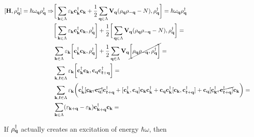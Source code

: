 \documentclass{homework}
\begin{document}
\begin{equation} 
\begin{split}
    [{\bf H}, \rho_{\bf q}^\dagger] = \hbar \omega_{{\bf q}} \rho_{{\bf q}}^\dagger  \Rightarrow & \bigg[\sum_{{\bf k} \in \Lambda} \varepsilon_{{\bf k}} {\bf c}_{{\bf k}}^\dagger {\bf c}_{{\bf k}} + \frac{1}{2} \sum_{{\bf q} \in \Lambda} {\bf V}_{{\bf q}} (\rho_{{\bf q}} \rho_{-{\bf q}} - N), \rho_{\bf q}^\dagger \bigg] = \hbar \omega_{{\bf q}} \rho_{{\bf q}}^\dagger \\
    & \bigg[\sum_{{\bf k} \in \Lambda} \varepsilon_{{\bf k}} {\bf c}_{{\bf k}}^\dagger {\bf c}_{{\bf k}}, \rho_{\bf q}^\dagger\bigg] + \frac{1}{2} \bigg[\sum_{{\bf q} \in \Lambda} {\bf V}_{{\bf q}} (\rho_{{\bf q}} \rho_{-{\bf q}} - N), \rho_{\bf q}^\dagger \bigg] = \\
    & \sum_{{\bf k} \in \Lambda} \varepsilon_{{\bf k}} \bigg[ {\bf c}_{{\bf k}}^\dagger {\bf c}_{{\bf k}}, \rho_{\bf q}^\dagger\bigg] + \frac{1}{2} \sum_{{\bf q} \in \Lambda} {\bf V}_{{\bf q}} \cancel{\bigg[\rho_{{\bf q}} \rho_{-{\bf q}}, \rho_{\bf q}^\dagger\bigg]} = \\
    & \sum_{{\bf k}, \mathfrak{k} \in \Lambda} \varepsilon_{{\bf k}} \bigg[ {\bf c}_{{\bf k}}^\dagger {\bf c}_{{\bf k}}, {\bf c}_{{\bf q}} {\bf c}_{{\bf \mathfrak{k} + q}}^\dagger \bigg] =  \\
    &\sum_{{\bf k}, \mathfrak{k} \in \Lambda} \varepsilon_{{\bf k}} \bigg({\bf c}_{{\bf k}}^\dagger \cancel{[{\bf c}_{{\bf k}}, {\bf c}_{{\bf q}}]} {\bf c}_{{\bf \mathfrak{k} + q}}^\dagger + [{\bf c}_{{\bf k}}^\dagger, {\bf c}_{{\bf q}}] {\bf c}_{{\bf k}} {\bf c}_{{\bf k}}^\dagger + {\bf c}_{{\bf q}} {\bf c}_{{\bf k}}^\dagger [{\bf c}_{{\bf k}}, {\bf c}_{{\bf \mathfrak{k} + q}}^\dagger] + {\bf c}_{{\bf q}} \cancel{[{\bf c}_{{\bf k}}^\dagger, {\bf c}_{{\bf \mathfrak{k} + q}}^\dagger]} {\bf c}_{{\bf k}} \bigg) = \\
    & \sum_{{\bf k} \in \Lambda} (\varepsilon_{{\bf k + q}} - \varepsilon_{{\bf k}}) {\bf c}_{{\bf {\bf k} + q}}^\dagger {\bf c}_{{\bf k}} = 
\end{split}
\end{equation}

If $\rho_{{\bf q}}^\dagger$ actually creates an excitation of energy $\hbar \omega$, then 
\end{document}
